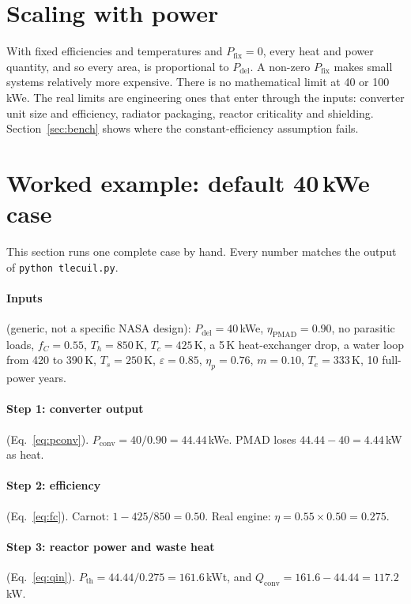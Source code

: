 \documentclass[11pt]{article}
\numberwithin{equation}{section}
\numberwithin{table}{section}
\newcommand{\Pdel}{P_\text{del}}
\newcommand{\Pconv}{P_\text{conv}}
\newcommand{\Pth}{P_\text{th}}
\begin{document}
\section{Scaling with power}\label{sec:scaling}
With fixed efficiencies and temperatures and $P_\text{fix}=0$, every heat and power
quantity, and so every area, is proportional to $\Pdel$. A non-zero $P_\text{fix}$
makes small systems relatively more expensive. There is no mathematical limit at
40 or 100\,kWe. The real limits are engineering ones that enter through the inputs:
converter unit size and efficiency, radiator packaging, reactor criticality and
shielding. Section~\ref{sec:bench} shows where the constant-efficiency assumption
fails.

\section{Worked example: default 40\,kWe case}\label{sec:worked}
This section runs one complete case by hand. Every number matches the output of
\texttt{python tlecuil.py}.

\paragraph{Inputs} (generic, not a specific NASA design):
$\Pdel=40$\,kWe, $\eta_\text{PMAD}=0.90$, no parasitic loads, $f_C=0.55$, $T_h=850$\,K,
$T_c=425$\,K, a 5\,K heat-exchanger drop, a water loop from 420 to 390\,K, $T_s=250$\,K,
$\varepsilon=0.85$, $\eta_p=0.76$, $m=0.10$, $T_e=333$\,K, 10 full-power years.

\paragraph{Step 1: converter output} (Eq.~\eqref{eq:pconv}).
$\Pconv = 40/0.90 = 44.44$\,kWe. PMAD loses $44.44-40 = 4.44$\,kW as heat.

\paragraph{Step 2: efficiency} (Eq.~\eqref{eq:fc}).
Carnot: $1-425/850 = 0.50$. Real engine: $\eta = 0.55\times0.50 = 0.275$.

\paragraph{Step 3: reactor power and waste heat} (Eq.~\eqref{eq:qin}).
$\Pth = 44.44/0.275 = 161.6$\,kWt, and $Q_\text{conv} = 161.6-44.44 = 117.2$\,kW.
\end{document}
